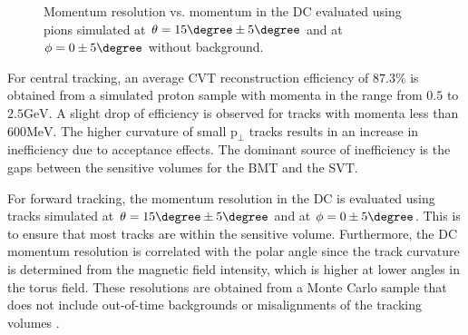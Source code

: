     \begin{figure}
        \centering{}
        \caption[DC momentum resolution vs momentum.]{Momentum resolution vs. momentum in the DC evaluated using pions simulated at $\theta = 15\degree \pm 5\degree$ and at $\phi = 0 \pm 5\degree$ without background.}
        \label{fig::dc_pres}
    \end{figure}

    For central tracking, an average CVT reconstruction efficiency of $87.3\%$ is obtained from a simulated proton sample with momenta in the range from $0.5$ to $2.5 \text{GeV}$.
    A slight drop of efficiency is observed for tracks with momenta less than $600 \text{MeV}$.
    The higher curvature of small $\text{p}_\perp$ tracks results in an increase in inefficiency due to acceptance effects.
    The dominant source of inefficiency is the gaps between the sensitive volumes for the BMT and the SVT.

    For forward tracking, the momentum resolution in the DC is evaluated using tracks simulated at $\theta = 15\degree \pm 5\degree$ and at $\phi = 0 \pm 5\degree$.
    This is to ensure that most tracks are within the sensitive volume.
    Furthermore, the DC momentum resolution is correlated with the polar angle since the track curvature is determined from the magnetic field intensity, which is higher at lower angles in the torus field.
    These resolutions are obtained from a Monte Carlo sample that does not include out-of-time backgrounds or misalignments of the tracking volumes \cite{ziegler2020}.
